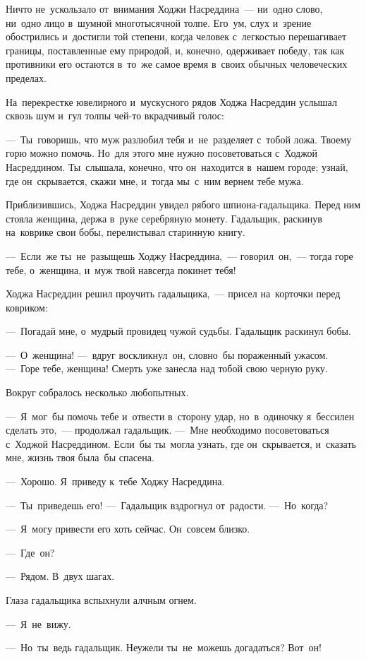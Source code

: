 \documentclass[12pt,a4paper]{book}
\begin{document}
Ничто не~ускользало от~внимания Ходжи Насреддина~— ни~одно слово, ни~одно лицо в~шумной многотысячной толпе. Его~ум, слух и~зрение обострились и~достигли той степени, когда человек с~легкостью перешагивает границы, поставленные ему природой, и, конечно, одерживает победу, так как противники его остаются в~то~же самое время в~своих обычных человеческих пределах.

На~перекрестке ювелирного и~мускусного рядов Ходжа Насреддин услышал сквозь шум и~гул толпы чей-то вкрадчивый голос:

—~Ты~говоришь, что муж разлюбил тебя и~не~разделяет с~тобой ложа. Твоему горю можно помочь. Но~для этого мне нужно посоветоваться с~Ходжой Насреддином. Ты~слышала, конечно, что он~находится в~нашем городе; узнай, где он~скрывается, скажи мне, и~тогда мы~с~ним вернем тебе мужа.

Приблизившись, Ходжа Насреддин увидел рябого шпиона-гадальщика. Перед ним стояла женщина, держа в~руке серебряную монету. Гадальщик, раскинув на~коврике свои бобы, перелистывал старинную книгу.

—~Если~же ты~не~разыщешь Ходжу Насреддина,~— говорил~он,~— тогда горе тебе, о~женщина, и~муж твой навсегда покинет тебя!

Ходжа Насреддин решил проучить гадальщика,~— присел на~корточки перед ковриком:

—~Погадай мне, о~мудрый провидец чужой судьбы. Гадальщик раскинул бобы.

—~О~женщина! —~вдруг воскликнул~он, словно~бы пораженный ужасом. —~Горе тебе, женщина! Смерть уже занесла над тобой свою черную руку.

Вокруг собралось несколько любопытных.

—~Я~мог~бы помочь тебе и~отвести в~сторону удар, но~в~одиночку я~бессилен сделать это,~— продолжал гадальщик. —~Мне необходимо посоветоваться с~Ходжой Насреддином. Если~бы ты~могла узнать, где он~скрывается, и~сказать мне, жизнь твоя была~бы спасена.

—~Хорошо. Я~приведу к~тебе Ходжу Насреддина.

—~Ты~приведешь его! —~Гадальщик вздрогнул от~радости. —~Но~когда?

—~Я~могу привести его хоть сейчас. Он~совсем близко.

—~Где~он?

—~Рядом. В~двух шагах.

Глаза гадальщика вспыхнули алчным огнем.

—~Я~не~вижу.

—~Но~ты~ведь гадальщик. Неужели ты~не~можешь догадаться? Вот~он!
\end{document}
